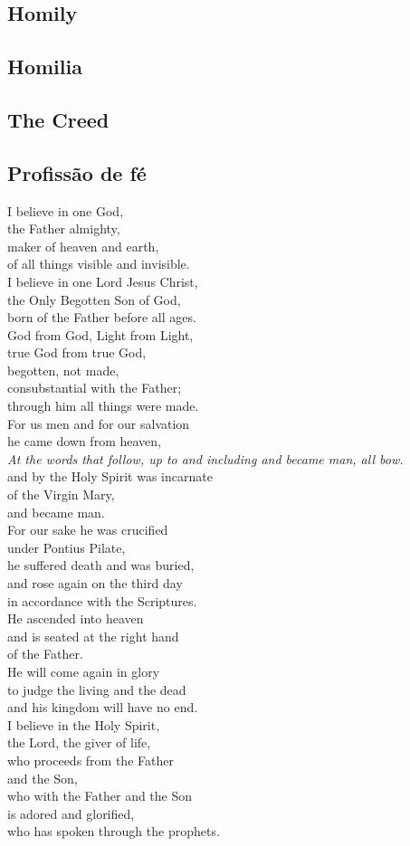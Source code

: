 \documentclass[10pt,a5]{article}
\newcommand \subsect[2] {\subsection*{#1} \switchcolumn \subsection*{#2} \switchcolumn*}
\begin{document}
\begin{paracol}{2}
 \subsect{Homily}{Homilia}

 \subsect{The Creed}{Profiss\~ao de f\'e}
I believe in one God,\\
the Father almighty,\\
maker of heaven and earth,\\
of all things visible and invisible.\\

\noindent
I believe in one Lord Jesus Christ,\\
the Only Begotten Son of God,\\
born of the Father before all ages.\\
God from God, Light from Light,\\
true God from true God,\\
begotten, not made,\\
consubstantial with the Father;\\
through him all things were made.\\
For us men and for our salvation\\
he came down from heaven,\\
{\tiny\textit{ At the words that follow, up to and including and became man, all bow.}}\\
and by the Holy Spirit was incarnate\\
of the Virgin Mary,\\
and became man.\\
For our sake he was crucified\\
under Pontius Pilate,\\
he suffered death and was buried,\\
and rose again on the third day\\
in accordance with the Scriptures.\\
He ascended into heaven\\
and is seated at the right hand\\
of the Father.\\
He will come again in glory\\
to judge the living and the dead\\
and his kingdom will have no end.\\

\noindent
I believe in the Holy Spirit,\\
the Lord, the giver of life,\\
who proceeds from the Father\\
and the Son,\\
who with the Father and the Son\\
is adored and glorified,\\
who has spoken through the prophets.\\


\end{paracol}
\end{document}
